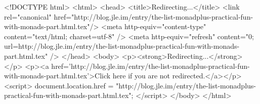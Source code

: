 <!DOCTYPE html>
<html>
<head>
<title>Redirecting...</title>
<link rel="canonical" href="http://blog.jle.im/entry/the-list-monadplus-practical-fun-with-monads-part.html.tex"/>
<meta http-equiv="content-type" content="text/html; charset=utf-8" />
<meta http-equiv="refresh" content="0; url=http://blog.jle.im/entry/the-list-monadplus-practical-fun-with-monads-part.html.tex" />
</head>
<body>
  <p><strong>Redirecting...</strong></p>
  <p><a href='http://blog.jle.im/entry/the-list-monadplus-practical-fun-with-monads-part.html.tex'>Click here if you are not redirected.</a></p>
  <script>
    document.location.href = "http://blog.jle.im/entry/the-list-monadplus-practical-fun-with-monads-part.html.tex";
  </script>
</body>
</html>
